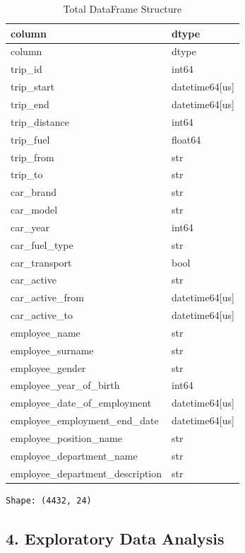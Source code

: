 \documentclass[
  letterpaper,
  DIV=11,
  numbers=noendperiod]{scrartcl}
\begin{document}
\begin{longtable}[]{@{}ll@{}}
\caption{Total DataFrame Structure}\label{T_56666}\tabularnewline
\toprule\noalign{}
column & dtype \\
\midrule\noalign{}
\endfirsthead
\toprule\noalign{}
column & dtype \\
\midrule\noalign{}
\endhead
\bottomrule\noalign{}
\endlastfoot
trip\_id & int64 \\
trip\_start & datetime64{[}us{]} \\
trip\_end & datetime64{[}us{]} \\
trip\_distance & int64 \\
trip\_fuel & float64 \\
trip\_from & str \\
trip\_to & str \\
car\_brand & str \\
car\_model & str \\
car\_year & int64 \\
car\_fuel\_type & str \\
car\_transport & bool \\
car\_active & str \\
car\_active\_from & datetime64{[}us{]} \\
car\_active\_to & datetime64{[}us{]} \\
employee\_name & str \\
employee\_surname & str \\
employee\_gender & str \\
employee\_year\_of\_birth & int64 \\
employee\_date\_of\_employment & datetime64{[}us{]} \\
employee\_employment\_end\_date & datetime64{[}us{]} \\
employee\_position\_name & str \\
employee\_department\_name & str \\
employee\_department\_description & str \\
\end{longtable}

\begin{verbatim}
Shape: (4432, 24)
\end{verbatim}

\subsection{4. Exploratory Data
Analysis}\label{exploratory-data-analysis}
\end{document}
